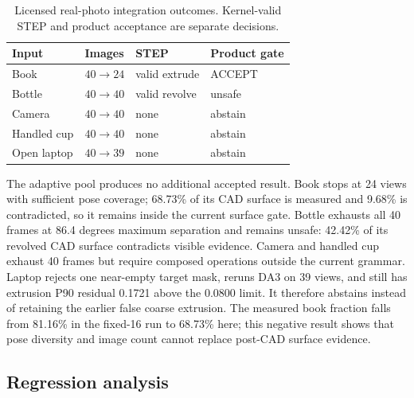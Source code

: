 \documentclass[10pt]{article}
\begin{document}
\begin{table}[t]
\centering
\caption{Licensed real-photo integration outcomes.  Kernel-valid STEP and
product acceptance are separate decisions.}
\label{tab:real}
\begin{tabular}{@{}llll@{}}
\toprule
Input & Images & STEP & Product gate \\
\midrule
Book & $40\rightarrow24$ & valid extrude & ACCEPT \\
Bottle & $40\rightarrow40$ & valid revolve & unsafe \\
Camera & $40\rightarrow40$ & none & abstain \\
Handled cup & $40\rightarrow40$ & none & abstain \\
Open laptop & $40\rightarrow39$ & none & abstain \\
\bottomrule
\end{tabular}
\end{table}

The adaptive pool produces no additional accepted result.  Book stops at 24
views with sufficient pose coverage; 68.73\% of its CAD surface is measured and
9.68\% is contradicted, so it remains inside the current surface gate.  Bottle
exhausts all 40 frames at 86.4 degrees maximum separation and remains unsafe:
42.42\% of its revolved CAD surface contradicts visible evidence.  Camera and
handled cup exhaust 40 frames but require composed operations outside the current
grammar.  Laptop rejects one near-empty target mask, reruns DA3 on 39 views, and
still has extrusion P90 residual 0.1721 above the 0.0800 limit.  It therefore
abstains instead of retaining the earlier false coarse extrusion.  The measured
book fraction falls from 81.16\% in the fixed-16 run to 68.73\% here; this
negative result shows that pose diversity and image count cannot replace
post-CAD surface evidence.

\subsection{Regression analysis}
\end{document}
